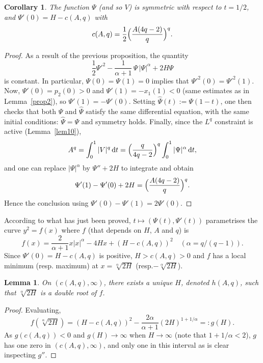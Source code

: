 \documentclass[11pt]{article}
\newcommand{\resp}{resp.\xspace}
\theoremstyle{plain}
\newtheorem{lemma}[theorem]{Lemma}
\newtheorem{cor}[theorem]{Corollary}
\theoremstyle{definition}
\renewcommand{\d}{\mathrm{d}}
\begin{document}
\begin{cor} \label{cor13}
The function $\Psi$ (and so $V$) is symmetric with respect to $t=1/2$, and
$\Psi'(0)=H-c(A,q)$ with
\[
c(A,q) = \frac{1}{2} \Bigl(\frac{A(4q-2)}{q} \Bigr)^q.
\]
\end{cor}
\begin{proof}
As a result of the previous proposition, the quantity
\[
\frac{1}{2}\Psi'^2-\frac{1}{\alpha+1}\,\Psi\,|\Psi|^\alpha+2H\Psi
\]
is constant. In particular, $\Psi(0)=\Psi(1)=0$ implies that $\Psi'^2(0)=\Psi'^2(1)$.
Now, $\Psi'(0)=p_2(0)>0$ and $\Psi'(1)=-x_1(1)<0$ (same estimates as in
Lemma~\ref{prop2}), so $\Psi'(1)=-\Psi'(0)$. Setting
$\hat{\Psi}(t):=\Psi(1-t)$, one then checks that both $\Psi$ and $\hat{\Psi}$ satisfy
the same differential equation, with the same initial conditions: $\hat{\Psi}=\Psi$
and symmetry holds.
Finally, since the $L^q$ constraint is
active (Lemma~\ref{lem10}),
\[
A^q = \int_0^1 |V|^q\,\d t
= \Bigl(\frac{q}{4q-2} \Bigr)^q \int_0^1 |\Psi|^\alpha\,\d t,
\]
and one can replace $|\Psi|^\alpha$ by $\Psi''+2H$ to integrate and obtain
\[
\Psi'(1)-\Psi'(0)+2H = \Bigl(\frac{A(4q-2)}{q} \Bigr)^q.
\]
Hence the conclusion using $\Psi'(0)-\Psi'(1)=2\Psi'(0)$.
\end{proof}

According to what has just been proved, $t \mapsto (\Psi(t),\Psi'(t))$
parametrises the curve $y^2=f(x)$ where $f$ (that depends on $H$, $A$ and $q$) is
\begin{equation} \label{eq61}
f(x) = \frac{2}{\alpha+1}x|x|^\alpha-4Hx+(H-c(A,q))^2 \quad (\alpha=q/(q-1)).
\end{equation}
Since $\Psi'(0)=H-c(A,q)$ is positive, $H > c(A,q) > 0$ and $f$ has a local minimum
(\resp maximum) at $x=\sqrt[\alpha]{2H}$ (\resp $-\sqrt[\alpha]{2H}$).

\begin{lemma} \label{lem12}
On $(c(A,q),\infty)$, there exists a unique $H$, denoted $h(A,q)$,
such that $\sqrt[\alpha]{2H}$ is a double root of $f$.
\end{lemma}
\begin{proof}
Evaluating,
\[
f(\sqrt[\alpha]{2H}) = (H-c(A,q))^2-\frac{2\alpha}{\alpha+1}(2H)^{1+1/\alpha}
=: g(H).
\]
As $g(c(A,q))<0$ and $g(H) \to \infty$ when $H \to \infty$ (note that $1+1/\alpha<2$),
$g$ has one zero in $(c(A,q),\infty)$, and only one in this interval as is clear
inspecting $g''$.
\end{proof}
\end{document}
